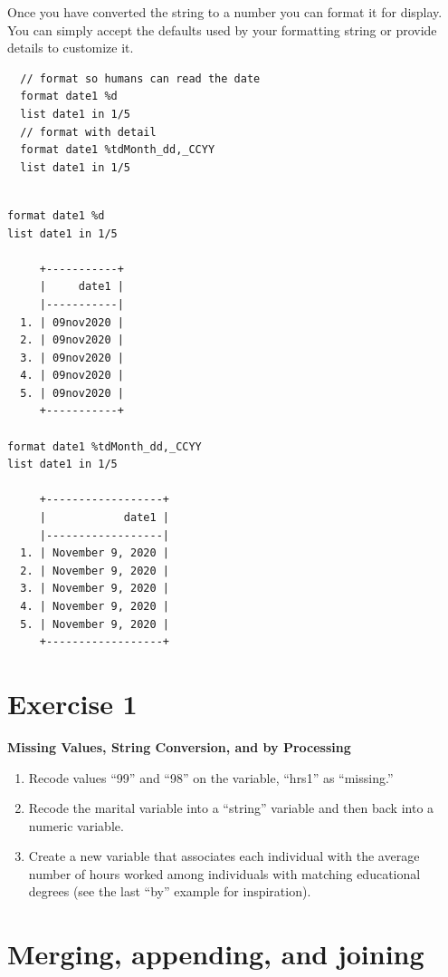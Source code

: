 \documentclass[]{book}
\providecommand{\tightlist}{%
  \setlength{\itemsep}{0pt}\setlength{\parskip}{0pt}}
\begin{document}
Once you have converted the string to a number you can format it for
display. You can simply accept the defaults used by your formatting
string or provide details to customize it.

\begin{verbatim}
  // format so humans can read the date
  format date1 %d
  list date1 in 1/5
  // format with detail
  format date1 %tdMonth_dd,_CCYY
  list date1 in 1/5
\end{verbatim}

\begin{verbatim}

format date1 %d
list date1 in 1/5

     +-----------+
     |     date1 |
     |-----------|
  1. | 09nov2020 |
  2. | 09nov2020 |
  3. | 09nov2020 |
  4. | 09nov2020 |
  5. | 09nov2020 |
     +-----------+

format date1 %tdMonth_dd,_CCYY
list date1 in 1/5

     +------------------+
     |            date1 |
     |------------------|
  1. | November 9, 2020 |
  2. | November 9, 2020 |
  3. | November 9, 2020 |
  4. | November 9, 2020 |
  5. | November 9, 2020 |
     +------------------+
\end{verbatim}

\section{Exercise 1}\label{exercise-1-5}

\textbf{Missing Values, String Conversion, and by Processing}

\begin{enumerate}
\def\labelenumi{\arabic{enumi}.}
\tightlist
\item
  Recode values ``99'' and ``98'' on the variable, ``hrs1'' as
  ``missing.''
\item
  Recode the marital variable into a ``string'' variable and then back
  into a numeric variable.
\item
  Create a new variable that associates each individual with the average
  number of hours worked among individuals with matching educational
  degrees (see the last ``by'' example for inspiration).
\end{enumerate}

\section{Merging, appending, and
joining}\label{merging-appending-and-joining}
\end{document}

